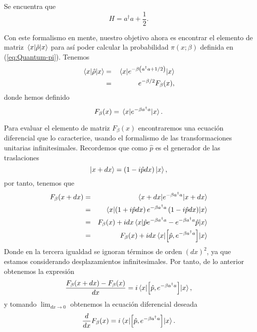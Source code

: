 \documentclass[%
 reprint,
 amsmath,amssymb,
 aps,
 pra,
]{revtex4-2}
\begin{document}
Se encuentra que 
\begin{equation}
	H = a^\dag a+\frac{1}{2}.
\end{equation}

Con este formalismo en mente, nuestro objetivo ahora es encontrar el elemento de matriz $\ev{\hat{\rho}}{x}$ para así poder calcular la probabilidad $\pi(x;\beta)$ definida en (\ref{eq:Quantum-pi}). Tenemos
\begin{eqnarray}
	\ev{\hat{\rho}}{x}	&=& \ev{e^{-\beta\left(a^\dag a + 1/2\right)}}{x} \nonumber \\
						&=& e^{-\beta/2}F_\beta(x) \label{eq:rho_x_x},
\end{eqnarray}
donde hemos definido
\begin{equation}
	F_\beta(x) = \ev{e^{-\beta a^\dag a}}{x}.
\end{equation}

Para evaluar el elemento de matriz $F_\beta(x)$ encontraremos una ecuación diferencial que lo caracterice, usando el formalismo de las transformaciones unitarias infinitesimales. Recordemos que como $\hat{p}$ es el generador de las traslaciones
\begin{equation}
	\ket{x+dx} = \left( 1 - i \hat{p} dx \right)\ket{x},
\end{equation}
por tanto, tenemos que
\begin{eqnarray}
	F_\beta(x+dx) 	&=& \ev{e^{-\beta a^\dag a}}{x+dx} \nonumber \\ 
					&=& \ev{\left( 1 + i \hat{p} dx \right)e^{-\beta a^\dag a}\left( 1 - i \hat{p} dx \right)}{x} \nonumber \\
					&=& F_\beta(x)+idx\ev{\hat{p}e^{-\beta a^\dag a} - e^{-\beta a^\dag a}\hat{p}}{x} \nonumber \\
					&=& F_\beta(x)+idx\ev{\left[\hat{p},e^{-\beta a^\dag a}\right]}{x}
\end{eqnarray}
Donde en la tercera igualdad se ignoran términos de orden $(dx)^2$, ya que estamos considerando desplazamientos infinitesimales. Por tanto, de lo anterior obtenemos la expresión
\begin{equation}
	\frac{F_\beta(x+dx)-F_\beta(x)}{dx} = i\ev{\left[\hat{p},e^{-\beta a^\dag a}\right]}{x},
\end{equation}
y tomando $\lim_{dx\rightarrow0}$ obtenemos la ecuación diferencial deseada
\begin{equation} 
	\frac{d}{dx}F_\beta(x) = i\ev{\left[\hat{p},e^{-\beta a^\dag a}\right]}{x}. \label{eq:Diff-Eqn-F(x)}
\end{equation}
\end{document}
